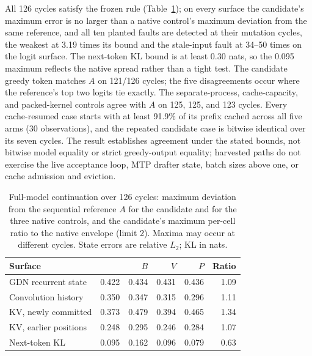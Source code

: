 All 126 cycles satisfy the frozen rule (Table~\ref{tab:fullmodel-agreement}); on every surface the candidate's maximum error is no larger than a native control's maximum deviation from the same reference, and all ten planted faults are detected at their mutation cycles, the weakest at 3.19 times its bound and the stale-input fault at 34--50 times on the logit surface. The next-token KL bound is at least 0.30 nats, so the 0.095 maximum reflects the native spread rather than a tight test. The candidate greedy token matches $A$ on 121/126 cycles; the five disagreements occur where the reference's top two logits tie exactly. The separate-process, cache-capacity, and packed-kernel controls agree with $A$ on 125, 125, and 123 cycles. Every cache-resumed case starts with at least 91.9\% of its prefix cached across all five arms (30 observations), and the repeated candidate case is bitwise identical over its seven cycles. The result establishes agreement under the stated bounds, not bitwise model equality or strict greedy-output equality; harvested paths do not exercise the live acceptance loop, MTP drafter state, batch sizes above one, or cache admission and eviction.

\begin{table}[t]
\caption{Full-model continuation over 126 cycles: maximum deviation from the sequential reference $A$ for the candidate and for the three native controls, and the candidate's maximum per-cell ratio to the native envelope (limit 2). Maxima may occur at different cycles. State errors are relative $L_2$; KL in nats.}
\label{tab:fullmodel-agreement}
\centering\small
\setlength{\tabcolsep}{3pt}
\begin{tabular}{@{}lrrrrr@{}}
\toprule
Surface & \sys{} & $B$ & $V$ & $P$ & Ratio \\
\midrule
GDN recurrent state & 0.422 & 0.434 & 0.431 & 0.436 & 1.09 \\
Convolution history & 0.350 & 0.347 & 0.315 & 0.296 & 1.11 \\
KV, newly committed & 0.373 & 0.479 & 0.394 & 0.465 & 1.34 \\
KV, earlier positions & 0.248 & 0.295 & 0.246 & 0.284 & 1.07 \\
Next-token KL & 0.095 & 0.162 & 0.096 & 0.079 & 0.63 \\
\bottomrule
\end{tabular}
\end{table}
